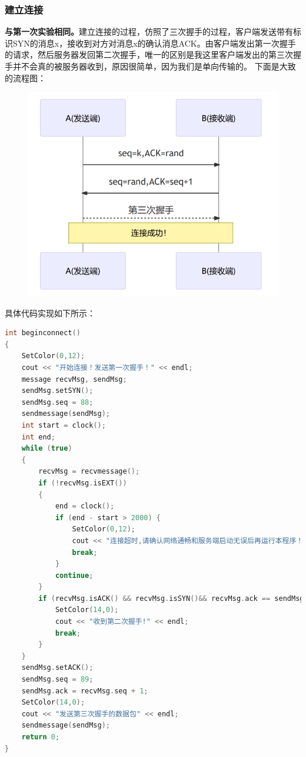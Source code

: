 \documentclass[UTF8,a4paper,10pt]{ctexart}
\begin{document}
\subsubsection{建立连接}
\textbf{与第一次实验相同。}建立连接的过程，仿照了三次握手的过程，客户端发送带有标识SYN的消息x，接收到对方对消息x的确认消息ACK。由客户端发出第一次握手的请求，然后服务器发回第二次握手，唯一的区别是我这里客户端发出的第三次握手并不会真的被服务器收到，原因很简单，因为我们是单向传输的。
下面是大致的流程图：
\begin{figure}[H]
    \centering
    \includegraphics[scale=0.6]{计网2.png}
    \label{fig:2}
\end{figure}
具体代码实现如下所示：
\begin{lstlisting}[title=客户端,frame=trbl,language={C++}]
int beginconnect()
{
    SetColor(0,12);
    cout << "开始连接！发送第一次握手！" << endl;
    message recvMsg, sendMsg;
    sendMsg.setSYN();
    sendMsg.seq = 88;
    sendmessage(sendMsg);
    int start = clock();
    int end;
    while (true)
    {
        recvMsg = recvmessage();
        if (!recvMsg.isEXT())
        {
            end = clock();
            if (end - start > 2000) {
                SetColor(0,12);
                cout << "连接超时,请确认网络通畅和服务端启动无误后再运行本程序！" << endl;
                break;
            }
            continue;
        }
        if (recvMsg.isACK() && recvMsg.isSYN()&& recvMsg.ack == sendMsg.seq + 1) {
            SetColor(14,0);
            cout << "收到第二次握手!" << endl;
            break;
        }
    }
    sendMsg.setACK();
    sendMsg.seq = 89;
    sendMsg.ack = recvMsg.seq + 1;
    SetColor(14,0);
    cout << "发送第三次握手的数据包" << endl;
    sendmessage(sendMsg);
    return 0;
}
\end{lstlisting}
\end{document}
